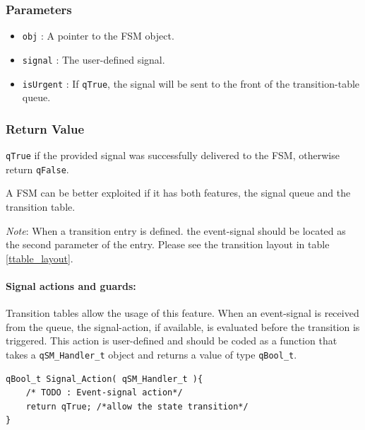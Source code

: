\documentclass{article}
\begin{document}
\subsubsection*{Parameters}
\begin{itemize}
    \item \lstinline{obj} : A pointer to the FSM object. 
    \item \lstinline{signal} : The user-defined signal.
    \item \lstinline{isUrgent} : If \lstinline{qTrue}, the signal will be sent to the front of the transition-table queue.
\end{itemize}

\subsubsection*{Return Value}
\lstinline{qTrue} if the provided signal was successfully delivered to the FSM, otherwise return \lstinline{qFalse}.

\hrulefill
\newline

\begin{tcolorbox}
\HandRight A FSM can be better exploited if it has both features, the signal queue and the transition table.
\end{tcolorbox}

\begin{tcolorbox}
\ArrowBoldDownRight \textit{Note}: When a transition entry is defined. the event-signal should be located as the second parameter of the entry. Please see the transition layout in table \ref{ttable_layout}.
\end{tcolorbox}

\paragraph{Signal actions and guards:} Transition tables allow the usage of this feature. When an event-signal is received from the queue, the signal-action, if available, is evaluated before the transition is triggered. This action is user-defined and should be coded as a function that takes a \lstinline{qSM_Handler_t} object and returns a value of type \lstinline{qBool_t}. \\

\begin{lstlisting}[style=CStyle]
qBool_t Signal_Action( qSM_Handler_t ){
    /* TODO : Event-signal action*/
    return qTrue; /*allow the state transition*/
}
\end{lstlisting}
\end{document}
